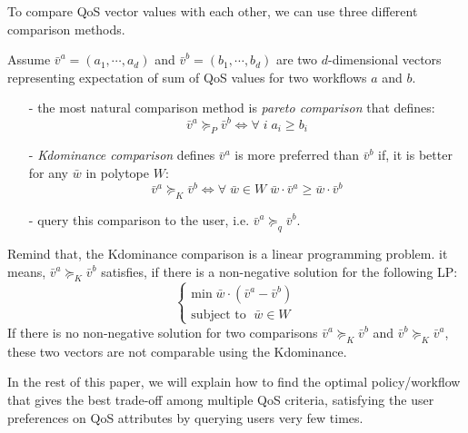 \documentclass[10pt,journal,compsoc]{IEEEtran}
\begin{document}
To compare QoS vector values with each other, we can use three different comparison methods.

Assume $\bar{v}^a = (a_1, \cdots, a_d)$  and $\bar{v}^b = (b_1, \cdots, b_d)$ are two $d$-dimensional vectors representing expectation of sum of QoS values for two workflows $a$ and $b$. 

\begin{itemize}
\item[-] the most natural comparison method is \emph{pareto comparison} that defines:
\begin{equation} \label{eq:pareto}
\bar{v}^a \succeq_P \bar{v}^b \Leftrightarrow \forall \; i \; a_i \geq b_i
\end{equation}\label{eq:kdom}
\item[-] \emph{Kdominance comparison} defines $\bar{v}^a$ is more preferred than $\bar{v}^b$ if, it is better for any $\bar{w}$ in polytope $W$:
\begin{equation}
\bar{v}^a \succeq_K \bar{v}^b \Leftrightarrow \forall \; \bar{w} \in W \; \bar{w} \cdot \bar{v}^a \geq \bar{w} \cdot \bar{v}^b
\end{equation}\label{eq:queryuser}
\item[-] query this comparison to the user, i.e. $\bar{v}^a  \succeq_q \bar{v}^b$. 
\end{itemize} 

Remind that, the Kdominance comparison is a linear programming problem. it means, $\bar{v}^a  \succeq_K \bar{v}^b$ satisfies, if there is a non-negative solution for the following LP:
\begin{equation}
\left\{
\begin{array}{ll}
\text{min} \; \bar{w} \cdot (\bar{v}^a - \bar{v}^b) \\
\text{subject to } \; \bar{w} \in W
\end{array}
\right.
\end{equation}
If there is no non-negative solution for two comparisons $\bar{v}^a  \succeq_K \bar{v}^b$ and $\bar{v}^b  \succeq_K \bar{v}^a$, these two vectors are not comparable using the Kdominance. 

In the rest of this paper, we will explain how to find the optimal policy/workflow that gives the best trade-off among multiple QoS criteria, satisfying the user preferences on QoS attributes by querying users very few times. %
\end{document}

